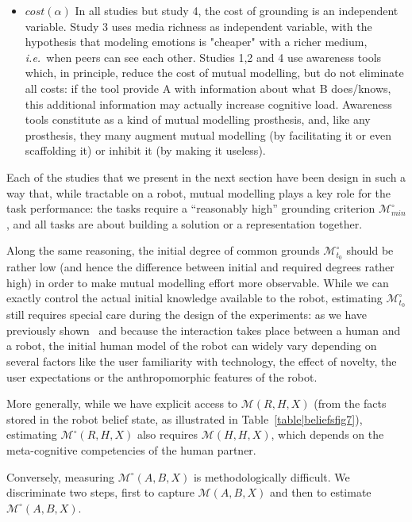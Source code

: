 \documentclass[twocolumn]{article}
\newcommand{\ie}{{\textit{i.e.\ }}}
\newcommand{\model}[3]{{$\mathcal{M}(#1, #2, #3)$}}
\newcommand{\Model}[3]{{$\mathcal{M}^{\circ}(#1, #2, #3)$}}
\newcommand{\groundingcriterion}{{$\mathcal{M}^{\circ}_{min}$}}
\newcommand{\inigrounding}{{$\mathcal{M}^{\circ}_{t_0}$}}
\begin{document}
\begin{itemize}
    \item $cost(\alpha)$ In all studies but study 4, the cost of  grounding is
        an independent variable. Study 3 uses media richness as independent
        variable, with the hypothesis that modeling emotions is "cheaper" with a
        richer medium, \ie  when peers can see each other.  Studies 1,2 and 4
        use awareness tools which, in principle, reduce the cost of mutual modelling, but do
        not eliminate all costs: if the tool provide A with information about
        what B does/knows, this additional information may actually increase
        cognitive load. Awareness tools constitute as a kind of mutual modelling prosthesis,
        and, like any prosthesis, they many augment mutual modelling (by facilitating it or
        even scaffolding it) or inhibit it (by making it useless).

\end{itemize}


Each of the studies that we present in the next section have been design in such a way that, while tractable on a
robot, mutual modelling plays a key role for the task performance: the tasks
require a ``reasonably high'' grounding criterion \groundingcriterion,
and all tasks are about building a solution or a representation together.

Along the same reasoning, the initial degree of common grounds \inigrounding
should be rather low (and hence the difference between initial and required
degrees rather high) in order to make mutual modelling effort more observable.
While we can exactly control the actual initial knowledge available to the
robot, estimating \inigrounding still requires special care during the design of
the experiments: as we have previously shown~\cite{lemaignan2014dynamics,
lemaignan2014cognitive} and because the interaction takes place between a human and
a robot, the initial human model of the robot can widely vary depending on
several factors like the user familiarity with technology, the effect of
novelty, the user expectations or the anthropomorphic features of the robot.

More generally, while we have explicit access to \model{R}{H}{X} (from the facts
stored in the robot belief state, as illustrated in
Table~\ref{table|beliefsfig7}), estimating \Model{R}{H}{X} also requires
\model{H}{H}{X}, which depends on the meta-cognitive competencies of the human
partner.

Conversely, measuring \Model{A}{B}{X} is methodologically difficult. We
discriminate two steps, first to capture \model{A}{B}{X} and then to
estimate \Model{A}{B}{X}. 
\end{document}
